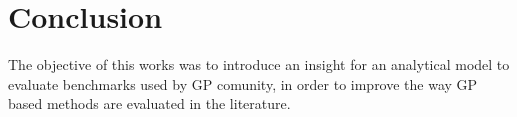 \section{Conclusion}

The objective of this works was to introduce an insight for an analytical model to evaluate benchmarks used by GP comunity, in order to improve the way GP based methods are evaluated in the literature.